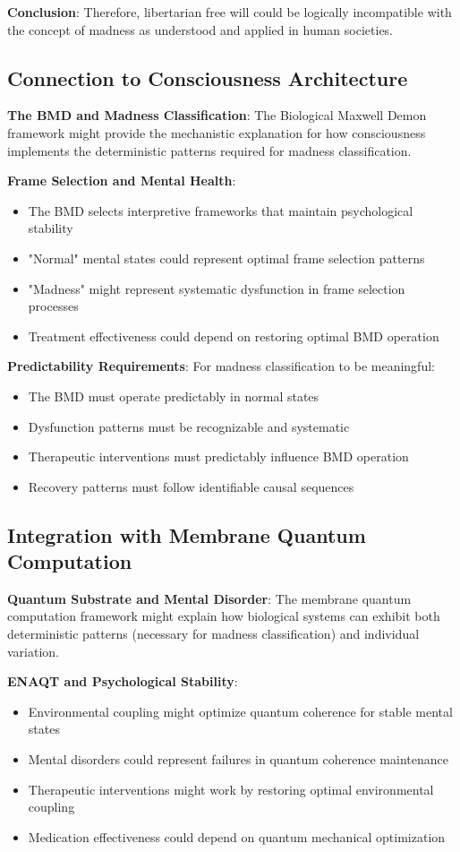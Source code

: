 \documentclass[12pt]{article}
\begin{document}
\textbf{Conclusion}: Therefore, libertarian free will could be logically incompatible with the concept of madness as understood and applied in human societies.

\subsection{Connection to Consciousness Architecture}

\textbf{The BMD and Madness Classification}: The Biological Maxwell Demon framework might provide the mechanistic explanation for how consciousness implements the deterministic patterns required for madness classification.

\textbf{Frame Selection and Mental Health}:
\begin{itemize}
\item The BMD selects interpretive frameworks that maintain psychological stability
\item "Normal" mental states could represent optimal frame selection patterns
\item "Madness" might represent systematic dysfunction in frame selection processes
\item Treatment effectiveness could depend on restoring optimal BMD operation
\end{itemize}

\textbf{Predictability Requirements}: For madness classification to be meaningful:
\begin{itemize}
\item The BMD must operate predictably in normal states
\item Dysfunction patterns must be recognizable and systematic
\item Therapeutic interventions must predictably influence BMD operation
\item Recovery patterns must follow identifiable causal sequences
\end{itemize}

\subsection{Integration with Membrane Quantum Computation}

\textbf{Quantum Substrate and Mental Disorder}: The membrane quantum computation framework might explain how biological systems can exhibit both deterministic patterns (necessary for madness classification) and individual variation.

\textbf{ENAQT and Psychological Stability}:
\begin{itemize}
\item Environmental coupling might optimize quantum coherence for stable mental states
\item Mental disorders could represent failures in quantum coherence maintenance
\item Therapeutic interventions might work by restoring optimal environmental coupling
\item Medication effectiveness could depend on quantum mechanical optimization
\end{itemize}
\end{document}
